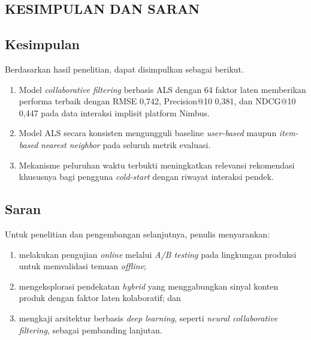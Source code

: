 \documentclass[12pt,a4paper]{report}
\begin{document}
\begin{onehalfspace}
\chapter{KESIMPULAN DAN SARAN}

\section{Kesimpulan}
Berdasarkan hasil penelitian, dapat disimpulkan sebagai berikut.
\begin{enumerate}
  \item Model \emph{collaborative filtering} berbasis ALS dengan 64 faktor
    laten memberikan performa terbaik dengan RMSE 0,742, Precision@10
    0,381, dan NDCG@10 0,447 pada data interaksi implisit platform Nimbus.
  \item Model ALS secara konsisten mengungguli baseline \emph{user-based}
    maupun \emph{item-based} \emph{nearest neighbor} pada seluruh metrik
    evaluasi.
  \item Mekanisme peluruhan waktu terbukti meningkatkan relevansi
    rekomendasi khususnya bagi pengguna \emph{cold-start} dengan riwayat
    interaksi pendek.
\end{enumerate}

\section{Saran}
Untuk penelitian dan pengembangan selanjutnya, penulis menyarankan:
\begin{enumerate}
  \item melakukan pengujian \emph{online} melalui \emph{A/B testing} pada
    lingkungan produksi untuk memvalidasi temuan \emph{offline};
  \item mengeksplorasi pendekatan \emph{hybrid} yang menggabungkan sinyal
    konten produk dengan faktor laten kolaboratif; dan
  \item mengkaji arsitektur berbasis \emph{deep learning}, seperti
    \emph{neural collaborative filtering}, sebagai pembanding lanjutan.
\end{enumerate}

\end{onehalfspace}
\end{document}
